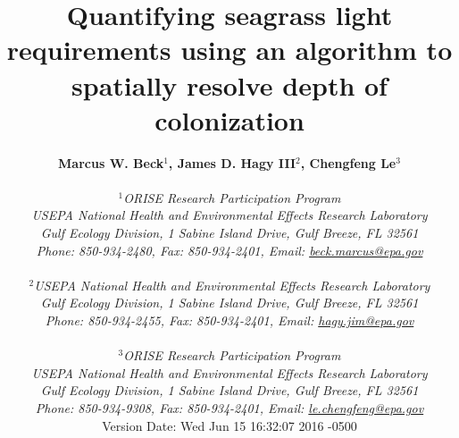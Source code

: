 \documentclass[letterpaper,12pt,oneside]{article}\usepackage[]{graphicx}\usepackage[]{color}
\begin{document}
\raggedbottom
\linenumbers
\raggedright
{}
\setlength{\parindent}{0.5in}
\renewcommand\refname{References \vspace{12pt}}

\begin{singlespace}
\title{{\bf {\Large Quantifying seagrass light requirements using an algorithm to spatially resolve depth of colonization}}}
\author{
  {\bf {\normalsize Marcus W. Beck$^1$, James D. Hagy III$^2$, Chengfeng Le$^3$}}
  \\\\{\textit {\normalsize $^1$ORISE Research Participation Program}}
  \\{\textit {\normalsize USEPA National Health and Environmental Effects Research Laboratory}}
  \\{\textit {\normalsize Gulf Ecology Division, 1 Sabine Island Drive, Gulf Breeze, FL 32561}}
	\\{\textit {\normalsize Phone: 850-934-2480, Fax: 850-934-2401, Email: \href{mailto:beck.marcus@epa.gov}{beck.marcus@epa.gov}}}
  \\\\{\textit {\normalsize $^2$USEPA National Health and Environmental Effects Research Laboratory}}
	\\{\textit {\normalsize Gulf Ecology Division, 1 Sabine Island Drive, Gulf Breeze, FL 32561}}
	\\{\textit {\normalsize Phone: 850-934-2455, Fax: 850-934-2401, Email: \href{mailto:hagy.jim@epa.gov}{hagy.jim@epa.gov}}}
  \\\\{\textit {\normalsize $^3$ORISE Research Participation Program}}
  \\{\textit {\normalsize USEPA National Health and Environmental Effects Research Laboratory}}
  \\{\textit {\normalsize Gulf Ecology Division, 1 Sabine Island Drive, Gulf Breeze, FL 32561}}
  \\{\textit {\normalsize Phone: 850-934-9308, Fax: 850-934-2401, Email: \href{mailto:le.chengfeng@epa.gov}{le.chengfeng@epa.gov}}}
  \vspace{1in} 
  \\ Version Date:   Wed Jun 15 16:32:07 2016 -0500
	}
\date{}
\maketitle
\end{singlespace}
\clearpage
\end{document}
